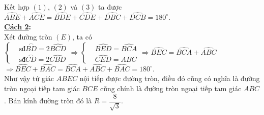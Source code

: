 \begin{bt}
{\begin{enumerate}
			Kết hợp $(1)$, $(2)$ và $(3)$ ta được $\widehat{ABE}+\widehat{ACE}=\widehat{BDE}+\widehat{CDE}+\widehat{DBC}+\widehat{DCB}=180^\circ$. \\
			\textbf{\underline{Cách 2}:}\\
			Xét đường tròn $(E)$, ta có $\left\{\begin{aligned}
			&\text{sđ}\overset\frown{BD}=2\widehat{BCD} \\
			&\text{sđ}\overset\frown{CD}=2\widehat{CBD}
			\end{aligned}\right. \Rightarrow \left\{\begin{aligned}
			&\widehat{BED}=\widehat{BCA} \\
			&\widehat{CED}=\widehat{ABC}
			\end{aligned}\right. \Rightarrow \widehat{BEC}=\widehat{BCA}+\widehat{ABC}$\\
			$\Rightarrow \widehat{BEC}+\widehat{BAC}=\widehat{BCA}+\widehat{ABC}+\widehat{BAC}=180^{\circ}$.\\
			Như vậy tứ giác $ABEC$ nội tiếp được đường tròn, điều đó cũng có nghĩa là đường tròn ngoại tiếp tam giác $BCE$ cũng chính là đường tròn ngoại tiếp tam giác $ABC$. Bán kính đường tròn đó là $R=\dfrac{8}{\sqrt{3}}$.
		\end{enumerate}}
\end{bt} 

